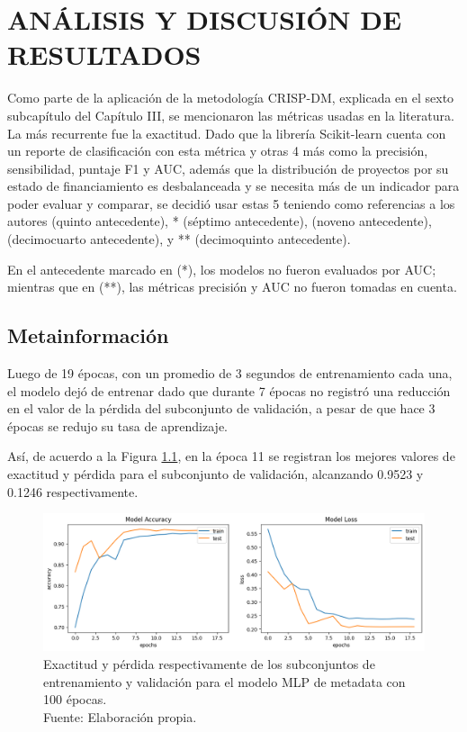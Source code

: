 \chapter{ANÁLISIS Y DISCUSIÓN DE RESULTADOS}
Como parte de la aplicación de la metodología CRISP-DM, explicada en el sexto subcapítulo del Capítulo III, se mencionaron las métricas usadas en la literatura. La más recurrente fue la exactitud. Dado que la librería Scikit-learn cuenta con un reporte de clasificación con esta métrica y otras 4 más como la precisión, sensibilidad, puntaje F1 y AUC, además que la distribución de proyectos por su estado de financiamiento es desbalanceada y se necesita más de un indicador para poder evaluar y comparar, se decidió usar estas 5 teniendo como referencias a los autores \citeauthor{pr_beckwith2016predcrowd} (quinto antecedente), \citeauthor{pr_yuan2016textanalytics}* (séptimo antecedente), \citeauthor{pr_kaur2017socmedcrowd} (noveno antecedente), \citeauthor{pr_cheng2019deeplearning} (decimocuarto antecedente), y \citeauthor{pr_chen2019keywords_crowdfunding}** (decimoquinto antecedente).

En el antecedente marcado en (*), los modelos no fueron evaluados por AUC; mientras que en (**), las métricas precisión y AUC no fueron tomadas en cuenta.

\section{Metainformación}
Luego de 19 épocas, con un promedio de 3 segundos de entrenamiento cada una, el modelo dejó de entrenar dado que durante 7 épocas no registró una reducción en el valor de la pérdida del subconjunto de validación, a pesar de que hace 3 épocas se redujo su tasa de aprendizaje.

Así, de acuerdo a la Figura \ref{5:fig1}, en la época 11 se registran los mejores valores de exactitud y pérdida para el subconjunto de validación, alcanzando 0.9523 y 0.1246 respectivamente.

\begin{figure}[!ht]
	\begin{center}
		\includegraphics[width=1\textwidth]{5/figures/metadata_model_acc_loss.png}
		\caption[Exactitud y pérdida respectivamente de los subconjuntos de entrenamiento y validación para el modelo MLP de metadata con 100 épocas]{Exactitud y pérdida respectivamente de los subconjuntos de entrenamiento y validación para el modelo MLP de metadata con 100 épocas.\\
		Fuente: Elaboración propia.}
		\label{5:fig1}
	\end{center}
\end{figure}

